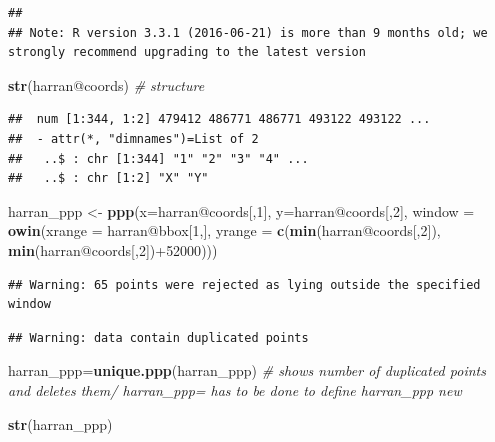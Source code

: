 \documentclass[]{article}
\newenvironment{Shaded}{\begin{snugshade}}{\end{snugshade}}
\newcommand{\KeywordTok}[1]{\textcolor[rgb]{0.13,0.29,0.53}{\textbf{{#1}}}}
\newcommand{\DataTypeTok}[1]{\textcolor[rgb]{0.13,0.29,0.53}{{#1}}}
\newcommand{\DecValTok}[1]{\textcolor[rgb]{0.00,0.00,0.81}{{#1}}}
\newcommand{\StringTok}[1]{\textcolor[rgb]{0.31,0.60,0.02}{{#1}}}
\newcommand{\CommentTok}[1]{\textcolor[rgb]{0.56,0.35,0.01}{\textit{{#1}}}}
\newcommand{\NormalTok}[1]{{#1}}
\begin{document}
\begin{verbatim}
## 
## Note: R version 3.3.1 (2016-06-21) is more than 9 months old; we strongly recommend upgrading to the latest version
\end{verbatim}

\begin{Shaded}
\begin{Highlighting}[]
\KeywordTok{str}\NormalTok{(harran@coords) }\CommentTok{# structure}
\end{Highlighting}
\end{Shaded}

\begin{verbatim}
##  num [1:344, 1:2] 479412 486771 486771 493122 493122 ...
##  - attr(*, "dimnames")=List of 2
##   ..$ : chr [1:344] "1" "2" "3" "4" ...
##   ..$ : chr [1:2] "X" "Y"
\end{verbatim}

\begin{Shaded}
\begin{Highlighting}[]
\NormalTok{harran_ppp <-}\StringTok{ }\KeywordTok{ppp}\NormalTok{(}\DataTypeTok{x=}\NormalTok{harran@coords[,}\DecValTok{1}\NormalTok{],}
                  \DataTypeTok{y=}\NormalTok{harran@coords[,}\DecValTok{2}\NormalTok{],}
                  \DataTypeTok{window =} \KeywordTok{owin}\NormalTok{(}\DataTypeTok{xrange =} \NormalTok{harran@bbox[}\DecValTok{1}\NormalTok{,],}
                                \DataTypeTok{yrange =} \KeywordTok{c}\NormalTok{(}\KeywordTok{min}\NormalTok{(harran@coords[,}\DecValTok{2}\NormalTok{]),}
                                          \KeywordTok{min}\NormalTok{(harran@coords[,}\DecValTok{2}\NormalTok{])+}\DecValTok{52000}\NormalTok{)))}
\end{Highlighting}
\end{Shaded}

\begin{verbatim}
## Warning: 65 points were rejected as lying outside the specified window
\end{verbatim}

\begin{verbatim}
## Warning: data contain duplicated points
\end{verbatim}

\begin{Shaded}
\begin{Highlighting}[]
\NormalTok{harran_ppp=}\KeywordTok{unique.ppp}\NormalTok{(harran_ppp) }\CommentTok{# shows number of duplicated points and deletes them/ harran_ppp= has to be done to define harran_ppp new}

\KeywordTok{str}\NormalTok{(harran_ppp)}
\end{Highlighting}
\end{Shaded}
\end{document}
